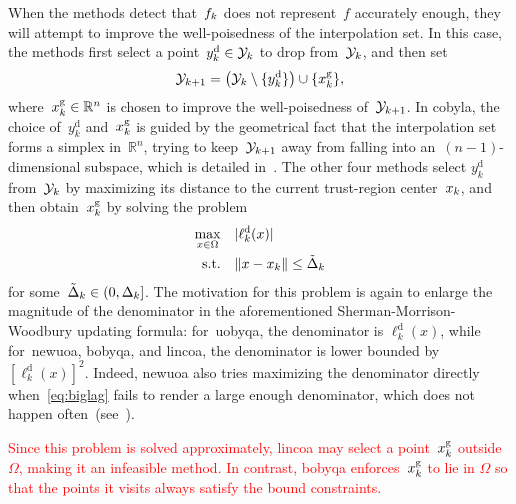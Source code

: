\documentclass[
    smallextended,  %
    draft,          %
]{svjour3}
\newcommand{\R}{\mathbb{R}}
\newcommand{\abs}[2][]{#1\lvert#2#1\rvert}
\newcommand{\drop}{{\text{d}}}
\newcommand{\fset}{\Omega}
\newcommand{\geo}{{\text{g}}}
\newcommand{\iter}[1][k]{x\ifthenelse{\equal{#1}{}}{}{_{#1}}}
\newcommand{\norm}[2][]{#1\lVert#2#1\rVert}
\newcommand{\objm}[1][k]{\obj\ifthenelse{\equal{#1}{}}{}{_{#1}}}
\newcommand{\obj}{f}
\newcommand{\radalt}[1][k]{\tilde{\Delta}\ifthenelse{\equal{#1}{}}{}{_{#1}}}
\newcommand{\rad}[1][k]{\Delta\ifthenelse{\equal{#1}{}}{}{_{#1}}}
\newcommand{\set}[2][]{#1\{#2#1\}}
\newcommand{\st}{\text{s.t.}}
\newcommand{\xpt}[1][k]{\mathcal{Y}\ifthenelse{\equal{#1}{}}{}{_{#1}}}
\newcommand{\red}{\textcolor{red}}
\begin{document}
When the methods detect that~$\objm$ does not represent~$\obj$ accurately enough, they will attempt
to improve the well-poisedness of the interpolation set.
In this case, the methods first select a point~$y_k^{\drop} \in \xpt$ to drop from~$\xpt$, and then set
\begin{equation}
    \label{eq:xpt-update-geo}
    \xpt[k + 1] = \left(\xpt \setminus \set{y_k^{\drop}}\right) \cup \set{\iter^{\geo}},
\end{equation}
where~$\iter^{\geo} \in \R^n$ is chosen to improve the well-poisedness of~$\xpt[k + 1]$.
In \gls{cobyla}, the choice of~$y_k^{\drop}$ and~$\iter^{\geo}$ is guided by the geometrical fact
that the interpolation set forms a simplex in~$\R^n$, trying to keep~$\xpt[k+1]$ away from falling into
an~$(n-1)$-dimensional subspace, which is detailed in~\cite[equations~(15)--(17)]{Powell_1994}.
The other four methods select $y_k^{\drop}$ from~$\xpt$ by maximizing its distance to
the current trust-region center~$\iter$, and then obtain~$\iter^{\geo}$ by solving the problem
\begin{equation}
    \label{eq:biglag}
    \begin{split}
        \max_{x \in \fset}  & \quad \abs{\ell_k^{\drop}(x)}\\
        \st                 & \quad \norm{x - \iter} \le \radalt
    \end{split}
\end{equation}
for some~$\radalt \in (0, \rad]$.
The motivation for this problem is again to enlarge the magnitude of the
denominator in the aforementioned Sherman-Morrison-Woodbury updating formula:
for~\gls{uobyqa}, the denominator is $\ell_k^{\drop}(x)$, while for~\gls{newuoa}, \gls{bobyqa},
and \gls{lincoa}, the denominator is lower bounded by $[\ell_k^{\drop}(x)]^2$.
Indeed, \gls{newuoa} also tries maximizing the denominator directly when~\eqref{eq:biglag}
fails to render a large enough denominator, which does not happen often~(see~\cite[\S~6]{Powell_2006}).

\red{
Since this problem is solved approximately, \gls{lincoa} may select a point~$\iter^{\geo}$
outside~$\fset$, making it an infeasible method.
In contrast, \gls{bobyqa} enforces~$\iter^{\geo}$ to lie in $\fset$ so that the points it visits
always satisfy the bound constraints.
}

\subsection{}
\label{ssec:cobyla}
\end{document}
